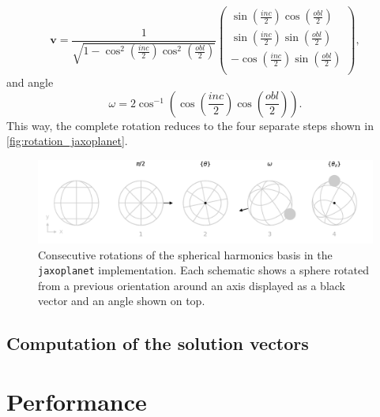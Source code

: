 \documentclass[modern]{aastex631}
\begin{document}
\begin{equation}
    \bm{v} = \frac{1}{\sqrt{1 - \cos^2{\left(\frac{inc}{2} \right)} \cos^2{\left(\frac{obl}{2}\right)}}} \begin{pmatrix}
        \sin{\left(\frac{inc}{2} \right)} \cos{\left(\frac{obl}{2}\right)}\\
        \sin{\left(\frac{inc}{2} \right)} \sin{\left(\frac{obl}{2}\right)}\\
         - \cos{\left(\frac{inc}{2} \right)} \sin{\left(\frac{obl}{2}\right)}\\
    \end{pmatrix},
\end{equation}
and angle
\begin{equation}
    \omega = 2 \cos^{-1}{\left(\cos{\left(\frac{inc}{2} \right)} \cos{\left(\frac{obl}{2}\right)} \right)}.
\end{equation}
This way, the complete rotation reduces to the four separate steps shown in \autoref{fig:rotation_jaxoplanet}.
\begin{figure}[H]
    \begin{center}
        \includegraphics[width=\textwidth]{../workflows/rotations/figures/rotation_jaxoplanet_1.pdf}
        \caption{Consecutive rotations of the spherical harmonics basis in the \texttt{jaxoplanet} implementation. Each schematic shows a sphere rotated from a previous orientation around an axis displayed as a black vector and an angle shown on top.}
        \label{fig:rotation_jaxoplanet}
    \end{center}
\end{figure}

\subsection{Computation of the solution vectors}\label{solution_vectors}

\newpage
\section{Performance}\label{performances}
\end{document}
